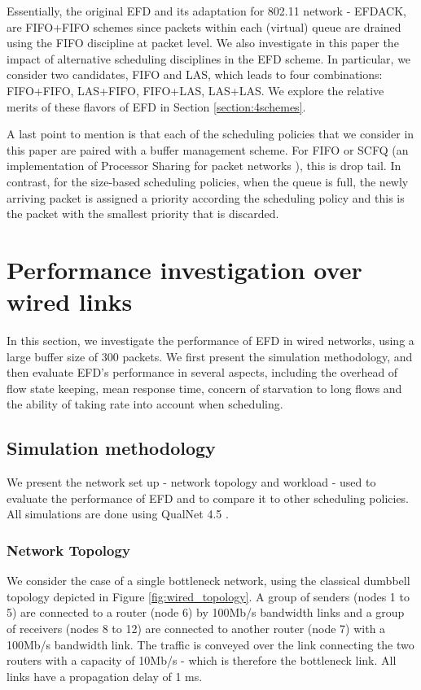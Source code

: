 \documentclass[preprint,12pt]{elsarticle}
\begin{document}
Essentially, the original EFD and its adaptation for 802.11 network - EFDACK, are FIFO+FIFO schemes since packets within each (virtual) queue are drained using the FIFO discipline at packet level. We also investigate in this paper the impact of alternative scheduling disciplines in the EFD scheme. In particular, we consider two candidates, FIFO and LAS, which leads to four combinations: FIFO+FIFO, LAS+FIFO, FIFO+LAS, LAS+LAS. We explore the relative merits of these flavors of EFD in Section \ref{section:4schemes}.


A last point to mention is that each of the scheduling policies that we consider in this paper are paired with a buffer management scheme. For FIFO or SCFQ (an implementation of Processor Sharing for packet networks \cite{Golestani94}), this is drop tail. In contrast, for the size-based scheduling policies, when the queue is full, the newly arriving packet is assigned a priority according the scheduling policy and this is the packet with the smallest priority that is discarded.


\section{Performance investigation over wired links}
\label{sec:perf_wired}
In this section, we investigate the performance of EFD in wired networks, using a large buffer size of 300 packets. We first present the simulation methodology, and then evaluate EFD's performance in several aspects, including the overhead of flow state keeping, mean response time, concern of starvation to long flows and the ability of taking rate into account when scheduling. 

\subsection{Simulation methodology} \label{sec:wired_methodology}
We present the network set up - network topology and workload - used to evaluate the performance of EFD and to compare it to other scheduling policies. All simulations are done using QualNet 4.5 \cite{Qualnet}.

\subsubsection{Network Topology}
We consider the case of a single bottleneck network, using the classical dumbbell topology depicted in Figure \ref{fig:wired_topology}. A group of senders (nodes 1 to 5) are connected to a router (node 6) by 100Mb/s bandwidth links and a group of receivers (nodes 8 to 12) are connected to another router (node 7) with a 100Mb/s bandwidth link. The traffic is conveyed over the link connecting the two routers with a capacity of 10Mb/s - which is therefore the bottleneck link. All links have a propagation delay of 1 ms.
\end{document}
